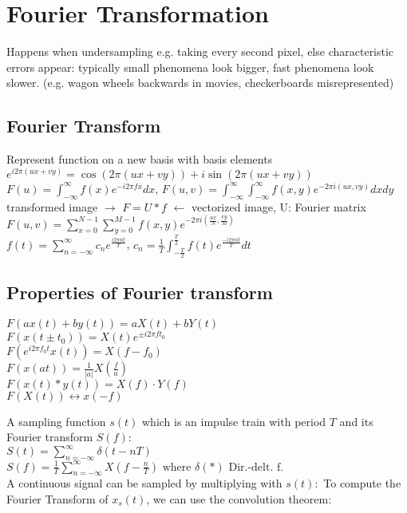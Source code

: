 

\section{Fourier Transformation}
 Happens when undersampling e.g. taking every second pixel, else characteristic errors appear: typically small phenomena look bigger, fast phenomena look slower. (e.g. wagon wheels backwards in movies, checkerboards misrepresented)
\subsection*{Fourier Transform}
Represent function on a new basis with basis elements $e^{i 2 \pi (ux + vy)} = \cos(2 \pi (ux + vy)) + i \sin(2 \pi (ux + vy))$\\
$F(u) = \int_{-\infty}^{\infty} f(x) e^{-i 2 \pi fx} dx$,  $F(u, v) = \int_{-\infty}^{\infty} \int_{-\infty}^{\infty} f(x, y) e^{-2\pi i (ux, vy)}dx dy$\\
 transformed image $\rightarrow$ $F = U * f$ $\leftarrow$ vectorized image, U: Fourier matrix\\
 $F(u, v) = \sum_{x=0}^{N-1} \sum_{y=0}^{M-1} f(x, y) e^{-2\pi i (\frac{ux}{N}, \frac{vy}{M})}$\\
 $f(t) = \sum_{n = -\infty}^{\infty} c_n e^{\frac{i 2 \pi n t}{T}}$, $c_n = \frac{1}{T} \int_{-\frac{T}{2}}^{\frac{T}{2}} f(t) e^{\frac{-i 2 \pi n t}{T}} dt$
\subsection*{Properties of Fourier transform}
 $F(ax(t) + by(t)) = aX(t) + bY(t)$\\
 $F(x(t \pm t_0)) = X(t) e^{\pm i 2 \pi f t_0}$\\
 $F(e^{i 2 \pi f_0 t} x(t)) = X(f - f_0)$\\
 $F(x(at)) = \frac{1}{|a|}X\left(\frac{f}{a}\right)$\\
 $F(x(t) * y(t)) = X(f) \cdot Y(f)$\\
 $F(X(t)) \longleftrightarrow x(-f)$

\color{definitionColor}
 \color{black}

A sampling function $s(t)$ which is an impulse train with period $T$ and its Fourier transform $S(f)$:\\
\color{gray}
$S(t) = \sum_{n = -\infty}^\infty \delta\left(t - nT\right)$\\
$ S(f) = \frac{1}{T} \sum_{n = -\infty}^\infty X(f - \frac{n}{T}) \text{ where } \delta(*) \text{  Dir.-delt. f.}$\\
\color{black}
A continuous signal can be sampled by multiplying with $s(t):$ To compute the Fourier Transform of $x_s(t)$, we can use the convolution theorem:

